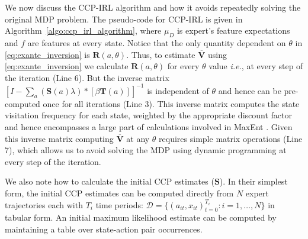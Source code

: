 \documentclass{article}
\begin{document}
We now discuss the CCP-IRL algorithm and how it avoids repeatedly solving the original MDP problem.
The pseudo-code for CCP-IRL is given in Algorithm~\ref{algo:ccp_irl_algorithm}, where $\mu_D$ is expert's feature expectations and $f$ are features at every state.
Notice that the only quantity dependent on $\theta$ in \eqref{eq:exante_inversion} is $\mathbf{R}(a, \theta)$.
Thus, to estimate $\mathbf{\overline{V}}$ using \eqref{eq:exante_inversion} we calculate $\mathbf{R}(a, \theta)$ for every $\theta$ value \emph{i.e.}, at every step of the iteration (Line 6).
But the inverse matrix $\left[I-\sum_{a}(\mathbf{S}(a) \lambda) *\left[ \beta \mathbf{T}(a)  \right]\right]^{-1}$ is independent of $\theta$ and hence can be pre-computed once for all iterations (Line 3).
This inverse matrix computes the state visitation frequency for each state, weighted by the appropriate discount factor and hence encompasses a large part of calculations involved in MaxEnt \cite{ziebart_phd}.
Given this inverse matrix computing $\mathbf{\overline{V}}$ at any $\theta$ requires simple matrix operations (Line 7), which allows us to avoid solving the MDP using dynamic programming at every step of the iteration.

We also note how to calculate the initial CCP estimates ($\mathbf{S}$). In their simplest form, the initial CCP estimates can be computed directly from $N$ expert trajectories each with $T_i$ time periods:  $\mathcal{D} = \{(a_{it},x_{it})_{t=0}^{T_i}:i=1,\dots,N\}$ in tabular form. An initial maximum likelihood estimate can be computed by maintaining a table over state-action pair occurrences.

\end{document}
